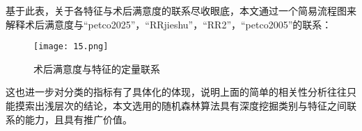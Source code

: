 基于此表，关于各特征与术后满意度的联系尽收眼底，本文通过一个简易流程图来解释术后满意度与“petco2025”，“RRjieshu”，“RR2”，“petco2005”的联系：

\begin{figure}[H] %
	\centering %
	\texttt{[image: 15.png]} 
	\caption{术后满意度与特征的定量联系} 
	\label{Fig.main15} 
\end{figure}
                       
这也进一步对分类的指标有了具体化的体现，说明上面的简单的相关性分析往往只能摸索出浅层次的结论，本文选用的随机森林算法具有深度挖掘类别与特征之间联系的能力，且具有推广价值。



















